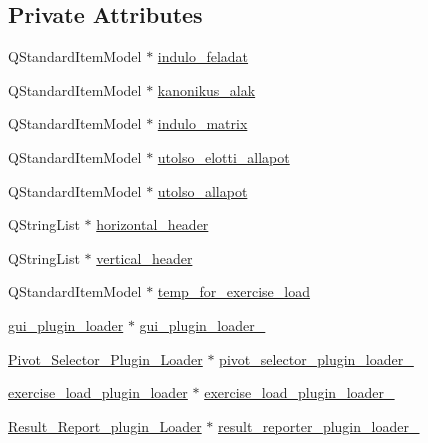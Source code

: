 \subsection*{Private Attributes}
\begin{DoxyCompactItemize}
\item 
Q\+Standard\+Item\+Model $\ast$ \hyperlink{classSimplex__method__calculator_acf8bb431b64fcf2908a15545e99f03d1}{indulo\+\_\+feladat}
\item 
Q\+Standard\+Item\+Model $\ast$ \hyperlink{classSimplex__method__calculator_a87e217fe6af8195f818ab26f998323fd}{kanonikus\+\_\+alak}
\item 
Q\+Standard\+Item\+Model $\ast$ \hyperlink{classSimplex__method__calculator_a556a57d97d6b71895a398dac9a8e9604}{indulo\+\_\+matrix}
\item 
Q\+Standard\+Item\+Model $\ast$ \hyperlink{classSimplex__method__calculator_a264578487fd7b250e5992770e334fe14}{utolso\+\_\+elotti\+\_\+allapot}
\item 
Q\+Standard\+Item\+Model $\ast$ \hyperlink{classSimplex__method__calculator_a69d9bbe0b61b92761fd045fcc21ec781}{utolso\+\_\+allapot}
\item 
Q\+String\+List $\ast$ \hyperlink{classSimplex__method__calculator_ab2a94f903380f24d68c0b2f7cfdbc37f}{horizontal\+\_\+header}
\item 
Q\+String\+List $\ast$ \hyperlink{classSimplex__method__calculator_a55815e72c04855ae4ad91ec9f95c1db8}{vertical\+\_\+header}
\item 
Q\+Standard\+Item\+Model $\ast$ \hyperlink{classSimplex__method__calculator_ac629d64f415e95c1ec0822148d1a0b0c}{temp\+\_\+for\+\_\+exercise\+\_\+load}
\item 
\hyperlink{classgui__plugin__loader}{gui\+\_\+plugin\+\_\+loader} $\ast$ \hyperlink{classSimplex__method__calculator_a367575287ffad43436910a2f3c694fb7}{gui\+\_\+plugin\+\_\+loader\+\_\+}
\item 
\hyperlink{classPivot__Selector__Plugin__Loader}{Pivot\+\_\+\+Selector\+\_\+\+Plugin\+\_\+\+Loader} $\ast$ \hyperlink{classSimplex__method__calculator_ac62043d7b1e90037ec44ff4a6264d7d4}{pivot\+\_\+selector\+\_\+plugin\+\_\+loader\+\_\+}
\item 
\hyperlink{classexercise__load__plugin__loader}{exercise\+\_\+load\+\_\+plugin\+\_\+loader} $\ast$ \hyperlink{classSimplex__method__calculator_aa7b7c8bc63683b8168fb3e5d13ae3bb3}{exercise\+\_\+load\+\_\+plugin\+\_\+loader\+\_\+}
\item 
\hyperlink{classResult__Report__plugin__Loader}{Result\+\_\+\+Report\+\_\+plugin\+\_\+\+Loader} $\ast$ \hyperlink{classSimplex__method__calculator_aea86692b8031fcf12410327c32af1cf9}{result\+\_\+reporter\+\_\+plugin\+\_\+loader\+\_\+}

\end{DoxyCompactItemize}
